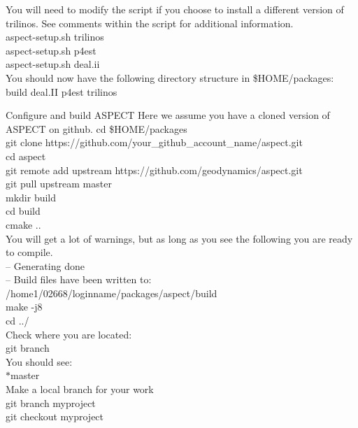 \documentclass[11pt]{article}
\makeatletter
\renewcommand{\section}{\@startsection
  {section}{1}{0mm}{3mm}{0.5mm}{\bfseries\large}}
\makeatother
\begin{document}
You will need to modify the script if you choose to install a different version of trilinos.  See comments within the script for additional information.\\
 
 aspect-setup.sh trilinos \\
 aspect-setup.sh p4est \\
 aspect-setup.sh deal.ii    \\
 
 You should now have the following directory structure in \$HOME/packages: \\
  
  build  deal.II  p4est  trilinos

 \section{Configure and build ASPECT}
 Here we assume you have a cloned version of ASPECT on github.  
 cd \$HOME/packages \\
 git clone https://github.com/your\_github\_account\_name/aspect.git \\
 cd aspect \\
 git remote add upstream https://github.com/geodynamics/aspect.git \\
 git pull upstream master  \\
 mkdir build \\
 cd build \\
 cmake ..  \\

You will get a lot of warnings, but as long as you see the following you are ready to compile. \\
-- Generating done \\
-- Build files have been written to: /home1/02668/loginname/packages/aspect/build \\

make -j8 \\
cd ../ \\ 

Check where you are located: \\
git branch  \\

You should see:  \\
 $*$master  \\
 
 Make a local branch for your work \\
 git branch myproject \\
 git checkout myproject \\
 
 
 

 

 
\end{document}
